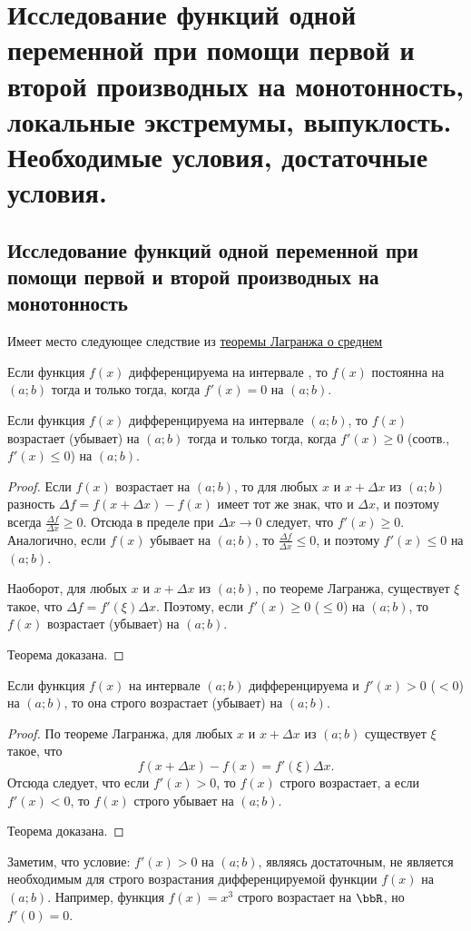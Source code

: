 \chapter{Исследование функций одной переменной при помощи первой и второй производных на монотонность, локальные экстремумы, выпуклость. Необходимые условия, достаточные условия.}

\section{Исследование функций одной переменной при помощи первой и второй производных на монотонность}

Имеет место следующее следствие из \hyperref[ch4t1]{теоремы Лагранжа о среднем}
\begin{thm} 
Если функция $f(x)$ дифференцируема на интервале , то $f(x)$ постоянна на $(a;b)$ тогда и только тогда, когда $f'(x)=0$ на $(a;b)$.
\end{thm}
 
\begin{thm}  Если функция $f(x)$ дифференцируема на интервале $(a;b)$, то $f(x)$ возрастает (убывает) на $(a;b)$ тогда и только тогда, когда $f'(x)\ge 0$ \textup{(}соотв., $f'(x)\le 0$\textup{)} на $(a;b)$.
\end{thm}
\begin{proof} Если $f(x)$ возрастает на $(a;b)$, то для любых $x$ и $x+\Delta x$ из $(a;b)$ разность $\Delta f = f(x+\Delta x) - f(x)$ имеет тот же знак, что и $\Delta x$, и поэтому всегда $\frac{\Delta f}{\Delta x} \ge 0$. Отсюда в пределе при $\Delta x \to 0$ следует, что $f'(x) \ge 0$. Аналогично, если $f(x)$ убывает на $(a;b)$, то $\frac{\Delta f}{\Delta x} \le 0$, и поэтому $f'(x) \le 0$ на $(a;b)$.

Наоборот, для любых $x$ и $x + \Delta x$ из $(a;b)$, по теореме Лагранжа, существует $\xi$ такое, что $\Delta f = f'(\xi)\Delta x$. Поэтому, если $f'(x) \ge 0$ ($\le 0$) на $(a;b)$, то $f(x)$ возрастает (убывает) на $(a;b)$.

\noindent Теорема доказана.
\end{proof}

\begin{thm}  Если функция $f(x)$ на интервале $(a;b)$ дифференцируема и $f'(x) > 0$ \textup{(}$< 0$\textup{)} на $(a;b)$, то она строго возрастает \textup{(}убывает\textup{)} на $(a;b)$.
\end{thm}
\begin{proof}
По теореме Лагранжа, для любых $x$ и $x + \Delta x$ из $(a; b)$ существует $\xi$ такое, что
$$
f(x+\Delta x)-f(x)=f'(\xi)\Delta x.
$$
Отсюда следует, что если $f'(x) > 0$, то $f(x)$ строго возрастает, а если $f'(x) < 0$, то $f(x)$ строго убывает на $(a;b)$. 

\noindent
Теорема доказана.
\end{proof}
Заметим, что условие: $f'(x) > 0$ на $(a;b)$, являясь достаточным, не является необходимым для строго возрастания дифференцируемой функции $f(x)$ на $(a;b)$. Например, функция $f(x) = x^3$ строго возрастает на $\bbR$, но $f'(0) = 0$.

